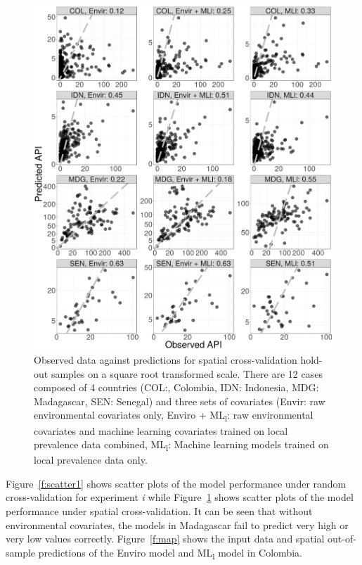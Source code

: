 \documentclass[review]{elsarticle}
\begin{document}
\begin{figure}
  \includegraphics[width=\textwidth]{figs/cv2_l_scatter.png}
\caption{
  Observed data against predictions for spatial cross-validation hold-out samples on a square root transformed scale.
  There are 12 cases composed of 4 countries (COL:, Colombia, IDN: Indonesia, MDG: Madagascar, SEN: Senegal) and three sets of covariates (Envir: raw environmental covariates only, Enviro +  ML\textsubscript{l}: raw environmental covariates and machine learning covariates trained on local prevalence data combined, ML\textsubscript{l}: Machine learning models trained on local prevalence data only.
}
\label{f:scatter2}
\end{figure}

Figure~\ref{f:scatter1} shows scatter plots of the model performance under random cross-validation for experiment \emph{i} while Figure~\ref{f:scatter2} shows scatter plots of the model performance under spatial cross-validation.
It can be seen that without environmental covariates, the models in Madagascar fail to predict very high or very low values correctly.
Figure~\ref{f:map} shows the input data and spatial out-of-sample predictions of the Enviro model and ML\textsubscript{l} model in Colombia.
\end{document}

